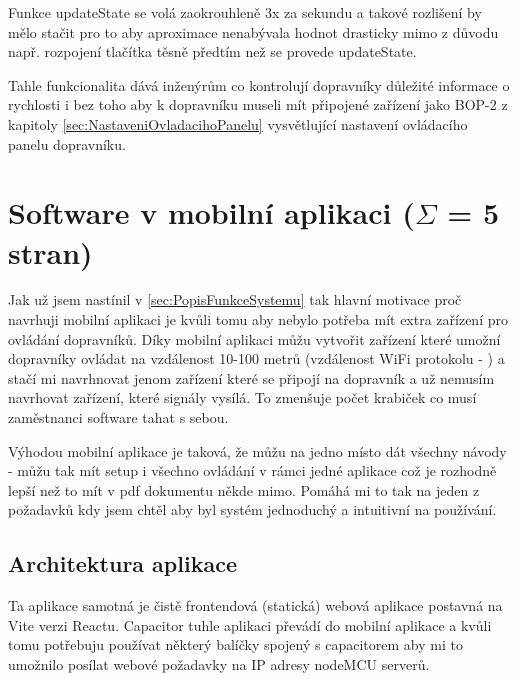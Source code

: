 Funkce updateState se volá zaokrouhleně 3x za sekundu a takové rozlišení by mělo stačit pro to aby aproximace nenabývala hodnot drasticky mimo z důvodu např. rozpojení tlačítka těsně předtím než se provede updateState.

Tahle funkcionalita dává inženýrům co kontrolují dopravníky důležité informace o rychlosti i bez toho aby k dopravníku museli mít připojené zařízení jako BOP-2 z kapitoly \ref{sec:NastaveniOvladacihoPanelu} vysvětlující nastavení ovládacího panelu dopravníku.

\section{Software v mobilní aplikaci ($\Sigma$ = 5 stran)}

Jak už jsem nastínil v \ref{sec:PopisFunkceSystemu} tak hlavní motivace proč navrhuji mobilní aplikaci je kvůli tomu aby nebylo potřeba mít extra zařízení pro ovládání dopravníků. Díky mobilní aplikaci můžu vytvořit zařízení které umožní dopravníky ovládat na vzdálenost 10-100 metrů (vzdálenost WiFi protokolu - ) a stačí mi navrhnovat jenom zařízení které se připojí na dopravník a už nemusím navrhovat zařízení, které signály vysílá. To zmenšuje počet krabiček co musí zaměstnanci software tahat s sebou.

Výhodou mobilní aplikace je taková, že můžu na jedno místo dát všechny návody - můžu tak mít setup i všechno ovládání v rámci jedné aplikace což je rozhodně lepší než to mít v pdf dokumentu někde mimo. Pomáhá mi to tak na jeden z požadavků kdy jsem chtěl aby byl systém jednoduchý a intuitivní na používání.

\subsection{Architektura aplikace}

Ta aplikace samotná je čistě frontendová (statická) webová aplikace postavná na Vite verzi Reactu. Capacitor tuhle aplikaci převádí do mobilní aplikace a kvůli tomu potřebuju používat některý balíčky spojený s capacitorem aby mi to umožnilo posílat webové požadavky na IP adresy nodeMCU serverů.

